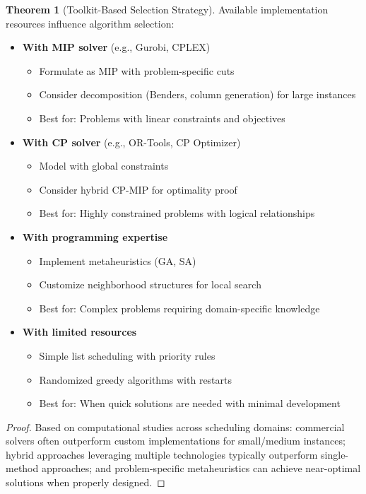 \documentclass{article}
\theoremstyle{definition}
\newtheorem{theorem}{Theorem}
\begin{document}
\begin{theorem}[Toolkit-Based Selection Strategy]
Available implementation resources influence algorithm selection:

\begin{itemize}
    \item \textbf{With MIP solver} (e.g., Gurobi, CPLEX)
    \begin{itemize}
        \item Formulate as MIP with problem-specific cuts
        \item Consider decomposition (Benders, column generation) for large instances
        \item Best for: Problems with linear constraints and objectives
    \end{itemize}
    
    \item \textbf{With CP solver} (e.g., OR-Tools, CP Optimizer)
    \begin{itemize}
        \item Model with global constraints
        \item Consider hybrid CP-MIP for optimality proof
        \item Best for: Highly constrained problems with logical relationships
    \end{itemize}
    
    \item \textbf{With programming expertise}
    \begin{itemize}
        \item Implement metaheuristics (GA, SA)
        \item Customize neighborhood structures for local search
        \item Best for: Complex problems requiring domain-specific knowledge
    \end{itemize}
    
    \item \textbf{With limited resources}
    \begin{itemize}
        \item Simple list scheduling with priority rules
        \item Randomized greedy algorithms with restarts
        \item Best for: When quick solutions are needed with minimal development
    \end{itemize}
\end{itemize}

\begin{proof}
Based on computational studies across scheduling domains: commercial solvers often outperform custom implementations for small/medium instances; hybrid approaches leveraging multiple technologies typically outperform single-method approaches; and problem-specific metaheuristics can achieve near-optimal solutions when properly designed.
\end{proof}
\end{theorem}
\end{document}
